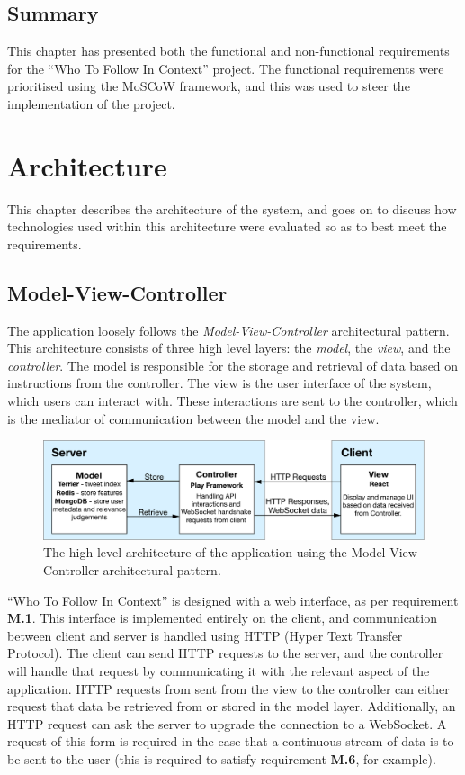 \documentclass{l4proj}
\begin{document}
\section{Summary}
This chapter has presented both the functional and non-functional requirements for the ``Who To Follow In Context'' project. The functional requirements were prioritised using the MoSCoW framework, and this was used to steer the implementation of the project.

\chapter{Architecture}

This chapter describes the architecture of the system, and goes on to discuss how technologies used within this architecture were evaluated so as to best meet the requirements.
    
    \section{Model-View-Controller}
    The application loosely follows the \textit{Model-View-Controller} architectural pattern. This architecture consists of three high level layers: the \textit{model}, the \textit{view}, and the \textit{controller}. The model is responsible for the storage and retrieval of data based on instructions from the controller. The view is the user interface of the system, which users can interact with. These interactions are sent to the controller, which is the mediator of communication between the model and the view.
    
\begin{figure}[H]
\centering
\includegraphics[scale=0.70]{mvc.pdf}
\caption{The high-level architecture of the application using the Model-View-Controller architectural pattern.}
\label{mvc}
\end{figure}

``Who To Follow In Context'' is designed with a web interface, as per requirement \textbf{M.1}. This interface is implemented entirely on the client, and communication between client and server is handled using HTTP (Hyper Text Transfer Protocol). The client can send HTTP requests to the server, and the controller will handle that request by communicating it with the relevant aspect of the application. HTTP requests from sent from the view to the controller can either request that data be retrieved from or stored in the model layer. Additionally, an HTTP request can ask the server to upgrade the connection to a WebSocket. A request of this form is required in the case that a continuous stream of data is to be sent to the user (this is required to satisfy requirement \textbf{M.6}, for example).
    
\end{document}
